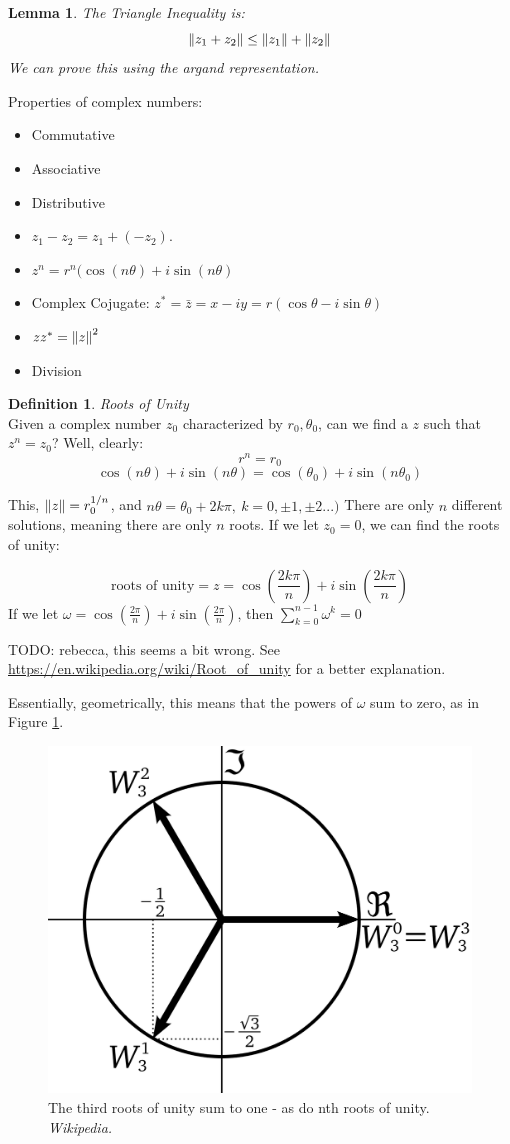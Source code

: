 \documentclass{article}
\newtheorem{lemma}{Lemma}
\theoremstyle{definition}
\newtheorem{definition}{Definition}[section]
\newcommand{\Def}[2]{
\begin{shaded*}
\begin{definition}{\textit{#1}}\\#2\end{definition}
\end{shaded*}
}
\begin{document}
\begin{lemma}
	The Triangle Inequality is:
	$$\norm{z_1 + z_2} \leq \norm{z_1} + \norm{z_2}$$
	We can prove this using the argand representation. 
\end{lemma}

Properties of complex numbers:

\begin{itemize}
	\item Commutative
	\item Associative
	\item Distributive
	\item $z_1 -z_2 = z_1 + (-z_2)$.
	\item $z^n = r^n(\cos(n\theta) + i \sin(n\theta)$
	\item Complex Cojugate: $z^* = \bar{z} = x-iy = r(\cos\theta - i \sin\theta)$
	\item $z z^* = \norm{z}^2$
	\item Division 
\end{itemize}

\Def{Roots of Unity}{Given a complex number $z_0$ characterized by $r_0, \theta_0$, can we find a $z$ such that $z^n = z_0$? Well, clearly:
$$r^n = r_0$$
$$\cos(n\theta) + i \sin(n\theta) = \cos(\theta_0) + i \sin(n\theta_0)$$

This, $\norm{z} = r_0^{1/n}$, and $n\theta = \theta_0 + 2k\pi,\ k = 0, \pm 1, \pm 2...)$ There are only $n$ different solutions, meaning there are only $n$ roots. If we let $z_0 = 0$, we can find the roots of unity:

$$\text{roots of unity} = z = \cos(\frac{2k\pi}{n}) + i \sin(\frac{2k\pi}{n})$$
If we let $\omega = \cos(\frac{2\pi}{n}) + i \sin(\frac{2\pi}{n})$, then $\sum_{k=0}^{n-1} \omega^k = 0$

TODO: rebecca, this seems a bit wrong. See \href{https://en.wikipedia.org/wiki/Root_of_unity}{https://en.wikipedia.org/wiki/Root\_of\_unity} for a better explanation.

Essentially, geometrically, this means that the powers of $\omega$ sum to zero, as in Figure \ref{fig:3rdrootsofunity}.

\begin{figure}[H]
	\centering
	\includegraphics[width=0.5\linewidth]{3rd_roots_of_unity}
	\caption{The third roots of unity sum to one - as do nth roots of unity. \textit{Wikipedia.}}
	\label{fig:3rdrootsofunity}
\end{figure}

}
\end{document}
